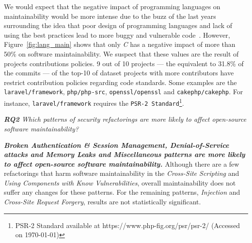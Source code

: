 \documentclass[10pt,conference]{IEEEtran}
\begin{document}
{\begin{itemize}
\end{itemize}


We would expect that the negative impact of programming languages on maintainability
would be more intense due to the buzz of the last years surrounding the idea that
poor design of programming languages and lack of using the best practices lead to
more buggy and vulnerable code~\cite{Ray:2017:LSP:3144574.3126905, 2019arXiv190110220B}.
However, Figure~\ref{fig:lang_main} shows that only \emph{C} has a negative impact of more than 50\% on
software maintainability. We suspect that these values are the result of projects
contributions policies. 9 out of 10 projects --- the equivalent to 31.8\% of the commits ---
of the top-10 of dataset projects with more contributors have restrict contribution
policies regarding code standards. Some examples are the \texttt{laravel/framework},
\texttt{php/php-src}, \texttt{openssl/openssl} and
\texttt{cakephp/cakephp}. For instance, \texttt{laravel/framework} requires the
\texttt{PSR-2 Standard}\footnote{PSR-2 Standard available at
https://www.php-fig.org/psr/psr-2/ (Accessed on \today{})}.

\begin{framed}
\textit{\textbf{RQ2} Which patterns of security refactorings are more likely to affect open-source software maintainability?}
\end{framed}

\textbf{\textit{Broken Authentication \& Session Management, Denial-of-Service attacks and Memory Leaks and Miscellaneous patterns are more likely to affect open-source software maintainability.}} Although there are
a few refactorings that harm software maintainability in the \emph{Cross-Site Scripting} and \emph{Using
Components with Know Vulnerabilities}, overall maintainability does not suffer any changes for these patterns.
For the remaining patterns, \emph{Injection} and \emph{Cross-Site Request Forgery}, results are not statistically
significant.


}
\end{document}
